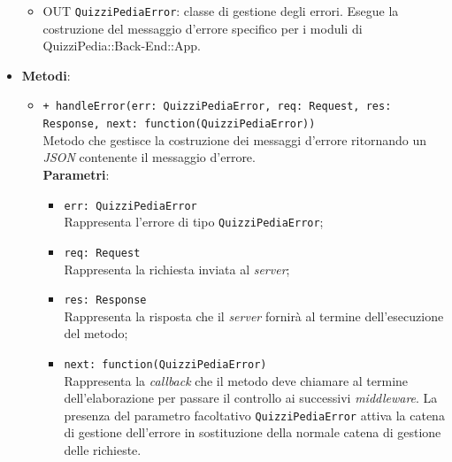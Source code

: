 \begin{itemize}
\begin{itemize}
		\item OUT \texttt{QuizziPediaError}:
		classe di gestione degli errori. Esegue la costruzione del messaggio d'errore specifico per i moduli di QuizziPedia::Back-End::App.
	\end{itemize}
	\item \textbf{Metodi}:
	\begin{itemize}
		\item \texttt{+ handleError(err: QuizziPediaError, req: Request, res: Response, next: function(QuizziPediaError))}\\
		Metodo che gestisce la costruzione dei messaggi d'errore ritornando un \textit{JSON} contenente il messaggio d'errore.\\
		\textbf{Parametri}:
		\begin{itemize}
			\item \texttt{err: QuizziPediaError}\\
			Rappresenta l'errore di tipo \texttt{QuizziPediaError};
			\item \texttt{req: Request}\\
			Rappresenta la richiesta inviata al \textit{server};
			\item \texttt{res: Response}\\
			Rappresenta la risposta che il \textit{server} fornirà al termine dell'esecuzione del metodo;
			\item \texttt{next: function(QuizziPediaError)}\\
			Rappresenta la \textit{callback} che il metodo deve chiamare al termine dell'elaborazione per passare il controllo ai successivi \textit{middleware}. La presenza del parametro facoltativo \texttt{QuizziPediaError} attiva la catena di gestione dell'errore in sostituzione della normale catena di gestione delle richieste.
		\end{itemize}
	\end{itemize}
\end{itemize}
